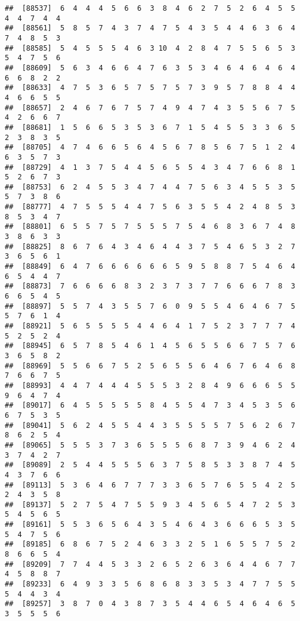 \documentclass[
]{book}
\begin{document}
\begin{verbatim}
##  [88537]  6  4  4  4  5  6  6  3  8  4  6  2  7  5  2  6  4  5  5  4  4  7  4  4
##  [88561]  5  8  5  7  4  3  7  4  7  5  4  3  5  4  4  6  3  6  4  7  4  8  5  3
##  [88585]  5  4  5  5  5  4  6  3 10  4  2  8  4  7  5  5  6  5  3  5  4  7  5  6
##  [88609]  5  6  3  4  6  6  4  7  6  3  5  3  4  6  4  6  4  6  4  6  6  8  2  2
##  [88633]  4  7  5  3  6  5  7  5  7  5  7  3  9  5  7  8  8  4  4  4  6  6  5  5
##  [88657]  2  4  6  7  6  7  5  7  4  9  4  7  4  3  5  5  6  7  5  4  2  6  6  7
##  [88681]  1  5  6  6  5  3  5  3  6  7  1  5  4  5  5  3  3  6  5  2  3  8  3  5
##  [88705]  4  7  4  6  6  5  6  4  5  6  7  8  5  6  7  5  1  2  4  6  3  5  7  3
##  [88729]  4  1  3  7  5  4  4  5  6  5  5  4  3  4  7  6  6  8  1  5  2  6  7  3
##  [88753]  6  2  4  5  5  3  4  7  4  4  7  5  6  3  4  5  5  3  5  5  7  3  8  6
##  [88777]  4  7  5  5  5  4  4  7  5  6  3  5  5  4  2  4  8  5  3  8  5  3  4  7
##  [88801]  6  5  5  7  5  7  5  5  5  7  5  4  6  8  3  6  7  4  8  3  8  6  3  3
##  [88825]  8  6  7  6  4  3  4  6  4  4  3  7  5  4  6  5  3  2  7  3  6  5  6  1
##  [88849]  6  4  7  6  6  6  6  6  6  5  9  5  8  8  7  5  4  6  4  6  5  4  4  7
##  [88873]  7  6  6  6  6  8  3  2  3  7  3  7  7  6  6  6  7  8  3  6  6  5  4  5
##  [88897]  5  5  7  4  3  5  5  7  6  0  9  5  5  4  6  4  6  7  5  5  7  6  1  4
##  [88921]  5  6  5  5  5  5  4  4  6  4  1  7  5  2  3  7  7  7  4  5  2  5  2  4
##  [88945]  6  5  7  8  5  4  6  1  4  5  6  5  5  6  6  7  5  7  6  3  6  5  8  2
##  [88969]  5  5  6  6  7  5  2  5  6  5  5  6  4  6  7  6  4  6  8  7  6  6  7  5
##  [88993]  4  4  7  4  4  4  5  5  5  3  2  8  4  9  6  6  6  5  5  9  6  4  7  4
##  [89017]  6  4  5  5  5  5  5  8  4  5  5  4  7  3  4  5  3  5  6  6  7  5  3  5
##  [89041]  5  6  2  4  5  5  4  4  3  5  5  5  5  7  5  6  2  6  7  8  6  2  5  4
##  [89065]  5  5  5  3  7  3  6  5  5  5  6  8  7  3  9  4  6  2  4  3  7  4  2  7
##  [89089]  2  5  4  4  5  5  5  6  3  7  5  8  5  3  3  8  7  4  5  4  3  7  6  6
##  [89113]  5  3  6  4  6  7  7  7  3  3  6  5  7  6  5  5  4  2  5  2  4  3  5  8
##  [89137]  5  2  7  5  4  7  5  5  9  3  4  5  6  5  4  7  2  5  3  5  4  5  6  5
##  [89161]  5  5  3  6  5  6  4  3  5  4  6  4  3  6  6  6  5  3  5  5  4  7  5  6
##  [89185]  6  8  6  7  5  2  4  6  3  3  2  5  1  6  5  5  7  5  2  8  6  6  5  4
##  [89209]  7  7  4  4  5  3  3  2  6  5  2  6  3  6  4  4  6  7  7  4  5  8  8  7
##  [89233]  6  4  9  3  3  5  6  8  6  8  3  3  5  3  4  7  7  5  5  5  4  4  3  4
##  [89257]  3  8  7  0  4  3  8  7  3  5  4  4  6  5  4  6  4  6  5  3  5  5  5  6

\end{verbatim}
\end{document}
